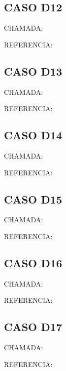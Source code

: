 \documentclass{undftex}
\begin{document}
\begin{refsection}
\section*{CASO D12}\noindent CHAMADA:
\par\noindent REFERENCIA:\par\printbibliography[heading=none]
\end{refsection}
\clearpage
\begin{refsection}
\section*{CASO D13}\noindent CHAMADA:
\par\noindent REFERENCIA:\par\printbibliography[heading=none]
\end{refsection}
\clearpage
\begin{refsection}
\section*{CASO D14}\noindent CHAMADA:
\par\noindent REFERENCIA:\par\printbibliography[heading=none]
\end{refsection}
\clearpage
\begin{refsection}
\section*{CASO D15}\noindent CHAMADA:
\par\noindent REFERENCIA:\par\printbibliography[heading=none]
\end{refsection}
\clearpage
\begin{refsection}
\section*{CASO D16}\noindent CHAMADA:
\par\noindent REFERENCIA:\par\printbibliography[heading=none]
\end{refsection}
\clearpage
\begin{refsection}
\section*{CASO D17}\noindent CHAMADA:
\par\noindent REFERENCIA:\par\printbibliography[heading=none]
\end{refsection}
\end{document}
